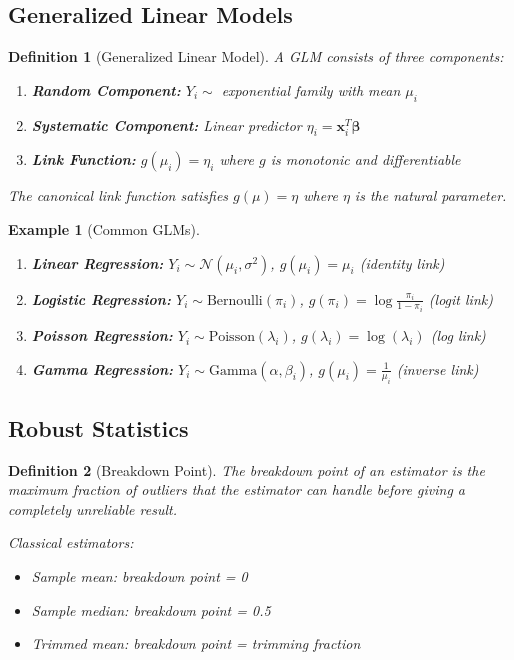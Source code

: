 \documentclass[12pt,a4paper]{article}
\newtheorem{definition}{Definition}[section]
\newtheorem{example}{Example}[section]
\theoremstyle{remark}
\begin{document}
\subsection{Generalized Linear Models}

\begin{definition}[Generalized Linear Model]
A GLM consists of three components:
\begin{enumerate}
\item \textbf{Random Component:} $Y_i \sim$ exponential family with mean $\mu_i$
\item \textbf{Systematic Component:} Linear predictor $\eta_i = \mathbf{x}_i^T \boldsymbol{\beta}$
\item \textbf{Link Function:} $g(\mu_i) = \eta_i$ where $g$ is monotonic and differentiable
\end{enumerate}

The canonical link function satisfies $g(\mu) = \eta$ where $\eta$ is the natural parameter.
\end{definition}

\begin{example}[Common GLMs]
\begin{enumerate}
\item \textbf{Linear Regression:} $Y_i \sim \mathcal{N}(\mu_i, \sigma^2)$, $g(\mu_i) = \mu_i$ (identity link)
\item \textbf{Logistic Regression:} $Y_i \sim \text{Bernoulli}(\pi_i)$, $g(\pi_i) = \log\frac{\pi_i}{1-\pi_i}$ (logit link)
\item \textbf{Poisson Regression:} $Y_i \sim \text{Poisson}(\lambda_i)$, $g(\lambda_i) = \log(\lambda_i)$ (log link)
\item \textbf{Gamma Regression:} $Y_i \sim \text{Gamma}(\alpha, \beta_i)$, $g(\mu_i) = \frac{1}{\mu_i}$ (inverse link)
\end{enumerate}
\end{example}

\subsection{Robust Statistics}

\begin{definition}[Breakdown Point]
The breakdown point of an estimator is the maximum fraction of outliers that the estimator can handle before giving a completely unreliable result.

Classical estimators:
\begin{itemize}
\item Sample mean: breakdown point = 0
\item Sample median: breakdown point = 0.5
\item Trimmed mean: breakdown point = trimming fraction
\end{itemize}
\end{definition}
\end{document}

